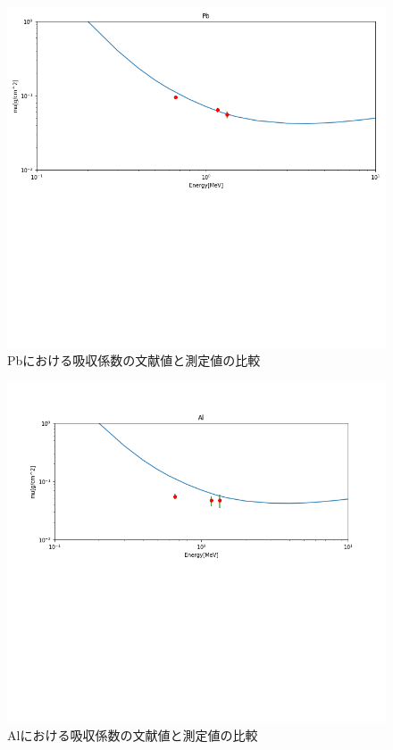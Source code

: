 \documentclass[a4paper,12pt]{jarticle}
\begin{document}
  \begin{figure}[htbp]
   \begin{center}
   \includegraphics[clip,width=14.0cm]{result_Pb.png}
    \caption{Pbにおける吸収係数の文献値と測定値の比較}
    \label{fig:result_Pb}
   \end{center}
  \end{figure}

  \begin{figure}[htbp]
   \begin{center}
   \includegraphics[clip,width=14.0cm]{result_Al.png}
    \caption{Alにおける吸収係数の文献値と測定値の比較}
    \label{fig:result_Al}
   \end{center}
  \end{figure}
\end{document}
